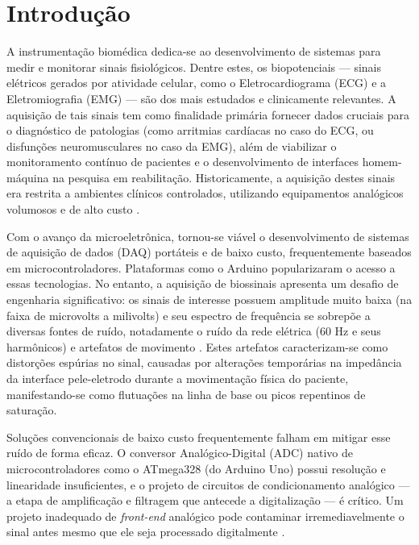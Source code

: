 \documentclass[tcc,capa]{texufpel}
\begin{document}
\tableofcontents

\chapter{Introdução}

A instrumentação biomédica dedica-se ao desenvolvimento de sistemas para medir e monitorar sinais fisiológicos. Dentre estes, os biopotenciais --- sinais elétricos gerados por atividade celular, como o Eletrocardiograma (ECG) e a Eletromiografia (EMG) --- são dos mais estudados e clinicamente relevantes. A aquisição de tais sinais tem como finalidade primária fornecer dados cruciais para o diagnóstico de patologias (como arritmias cardíacas no caso do ECG, ou disfunções neuromusculares no caso da EMG), além de viabilizar o monitoramento contínuo de pacientes e o desenvolvimento de interfaces homem-máquina na pesquisa em reabilitação. Historicamente, a aquisição destes sinais era restrita a ambientes clínicos controlados, utilizando equipamentos analógicos volumosos e de alto custo \cite{goldberger2000}.

Com o avanço da microeletrônica, tornou-se viável o desenvolvimento de sistemas de aquisição de dados (DAQ) portáteis e de baixo custo, frequentemente baseados em microcontroladores. Plataformas como o Arduino popularizaram o acesso a essas tecnologias. No entanto, a aquisição de biossinais apresenta um desafio de engenharia significativo: os sinais de interesse possuem amplitude muito baixa (na faixa de microvolts a milivolts) e seu espectro de frequência se sobrepõe a diversas fontes de ruído, notadamente o ruído da rede elétrica (60 Hz e seus harmônicos) e artefatos de movimento \cite{pathak2025}. Estes artefatos caracterizam-se como distorções espúrias no sinal, causadas por alterações temporárias na impedância da interface pele-eletrodo durante a movimentação física do paciente, manifestando-se como flutuações na linha de base ou picos repentinos de saturação.

Soluções convencionais de baixo custo frequentemente falham em mitigar esse ruído de forma eficaz. O conversor Analógico-Digital (ADC) nativo de microcontroladores como o ATmega328 (do Arduino Uno) possui resolução e linearidade insuficientes, e o projeto de circuitos de condicionamento analógico --- a etapa de amplificação e filtragem que antecede a digitalização --- é crítico. Um projeto inadequado de \textit{front-end} analógico pode contaminar irremediavelmente o sinal antes mesmo que ele seja processado digitalmente \cite{kim2016}.
\end{document}
